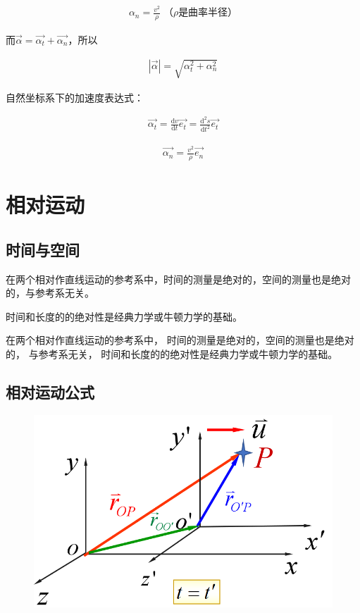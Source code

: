 \documentclass[
	12pt, %
	fleqn, %
	a4paper, %
]{myLegrandOrangeBook}
\newcommand{\rmd}{\mathrm{d}}
\newcommand{\deriv}[2]{\frac{\rmd #1}{\rmd #2}}
\begin{document}
    \begin{align}
        \alpha_n = \frac{v^2}{\rho}\; \text{（\(\rho\)是曲率半径）}
    \end{align}

    而\(\overrightarrow{\alpha} = \overrightarrow{\alpha_t} + \overrightarrow{\alpha_n}\)，所以

    \begin{align}
        \left|\overrightarrow{\alpha}\right| = \sqrt{\alpha_t^2 + \alpha_n^2}
    \end{align}

    自然坐标系下的加速度表达式：
    
    \begin{align}
        \overrightarrow{\alpha_t} = \deriv{v}{t} \overrightarrow{e_t} =
        \frac{\rmd^2 s}{\rmd t^2} \overrightarrow{e_t}
    \end{align}

    \begin{align}
        \overrightarrow{\alpha_n} = \frac{v^2}{\rho} \overrightarrow{e_n}
    \end{align}

\section{相对运动}

\subsection{时间与空间}

    在两个相对作直线运动的参考系中，时间的测量是绝对的，空间的测量也是绝对的，与参考系无关。

    时间和长度的的绝对性是经典力学或牛顿力学的基础。

    在两个相对作直线运动的参考系中， 时间的测量是绝对的，空间的测量也是绝对的， 与参考系无关， 时间和长度的的绝对性是经典力学或牛顿力学的基础。

\subsection{相对运动公式}

    \begin{figure}
        \centering
        \includegraphics[scale=0.3]{"Chapter 01 images/pic8.png"}
        \label{pic8}
    \end{figure}
\end{document}
